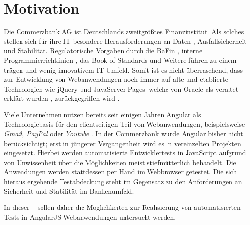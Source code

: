 \section{Motivation}\label{einleitung}
Die Commerzbank AG ist Deutschlands zweitgrößtes Finanzinstitut\cite[][2]{handelsblatt:commerzbank}. Als solches stellen sich für ihre IT besondere Herausforderungen an Daten-, Ausfallsicherheit und Stabilität. Regulatorische Vorgaben durch die BaFin \cite{bafin-banken}, interne Programmierrichtlinien \cite{coba-programmierrichtlinienAllgemein, coba-programmierrichtlinienJavaScript}, das Book of Standards  \cite{coba-bookOfStandards} und Weitere führen zu einem trägen und wenig innovativem IT-Umfeld. Somit ist es nicht überraschend, dass zur Entwicklung von Webanwendungen noch immer auf alte und etablierte Technologien wie jQuery und JavaServer Pages, welche von Oracle als veraltet erklärt wurden  \cite{jsp-deprecated}, zurückgegriffen wird \cite{cosy-mariscv}.

Viele Unternehmen nutzen bereits seit einigen Jahren Angular als Technologiebasis für den clientseitigen Teil von Webanwendungen, beispielsweise \textit{Gmail}, \textit{PayPal} oder \textit{Youtube} \cite{angular-sites}. In der Commerzbank wurde Angular bisher nicht berücksichtigt; erst in jüngerer Vergangenheit wird es in vereinzelten Projekten eingesetzt. Hierbei werden automatisierte Entwicklertests in JavaScript aufgrund von Unwissenheit über die Möglichkeiten meist stiefmütterlich behandelt. Die Anwendungen werden stattdessen per Hand im Webbrowser getestet. Die sich hieraus ergebende Testabdeckung steht im Gegensatz zu den Anforderungen an Sicherheit und Stabilität im Bankenumfeld.

In dieser \titleDocument~ sollen daher die Möglichkeiten zur Realisierung von automatisierten Tests in AngularJS-Webanwendungen untersucht werden.